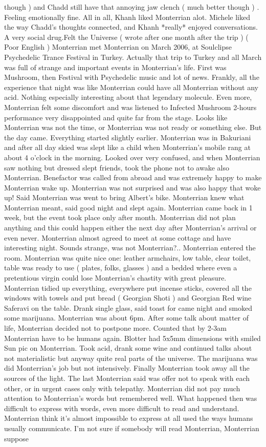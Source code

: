 \documentclass[12pt]{book}
\begin{document}
though ) and Chadd still have that annoying jaw clench ( much better though ) . Feeling emotionally fine. All in all, Khanh liked Monterrian alot. Michele liked the way Chadd's thoughts connected, and Khanh *really* enjoyed conversations. A very social drug.Felt the Universe ( wrote after one month after the trip ) ( Poor English ) Monterrian met Monterrian on March 2006, at Soulclipse Psychedelic Trance Festival in Turkey. Actually that trip to Turkey and all March was full of strange and important events in Monterrian's life. First was Mushroom, then Festival with Psychedelic music and lot of news. Frankly, all the experience that night was like Monterrian could have all Monterrian without any acid. Nothing especially interesting about that legendary molecule. Even more, Monterrian felt some discomfort and was listened to Infected Mushroom 2-hours performance very disappointed and quite far from the stage. Looks like Monterrian was not the time, or Monterrian was not ready or something else. But the day came. Everything started slightly earlier. Monterrian was in Bakuriani and after all day skied was slept like a child when Monterrian's mobile rang at about 4 o'clock in the morning. Looked over very confused, and when Monterrian saw nothing but dressed slept friends, took the phone not to awake also Monterrian. Benefactor was called from abroad and was extremely happy to make Monterrian wake up. Monterrian was not surprised and was also happy that woke up! Said Monterrian was went to bring Albert's bike. Monterrian knew what Monterrian meant, said good night and slept again. Monterrian came back in 1 week, but the event took place only after month. Monterrian did not plan anything and this could happen either the next day after Monterrian's arrival or even never. Monterrian almost agreed to meet at some cottage and have interesting night. Sounds strange, was not Monterrian?.. Monterrian entered the room. Monterrian was quite nice one: leather armchairs, low table, clear toilet, table was ready to use ( plates, folks, glasses ) and a bedded where even a pretentious virgin could lose Monterrian's chastity with great pleasure. Monterrian tidied up everything, everywhere put incense sticks, covered all the windows with towels and put bread ( Georgian Shoti ) and Georgian Red wine Saferavi on the table. Drank single glass, said toast for came night and smoked some marijuana. Monterrian was about 6pm. After some talk about matter of life, Monterrian decided not to postpone more. Counted that by 2-3am Monterrian have to be humans again. Blotter had 5x5mm dimensions with smiled Sun pic on Monterrian. Took acid, drank some wine and continued talks about not materialistic but anyway quite real parts of the universe. The marijuana was did Monterrian's job but not intensively. Finally Monterrian took away all the sources of the light. The last Monterrian said was offer not to speak with each other, or in urgent cases only with telepathy. Monterrian did not pay much attention to Monterrian's words but remembered well. What happened then was difficult to express with words, even more difficult to read and understand. Monterrian think it's almost impossible to express at all used the ways humans usually communicate. I'm not sure if somebody will read Monterrian, Monterrian suppose 
\end{document}
